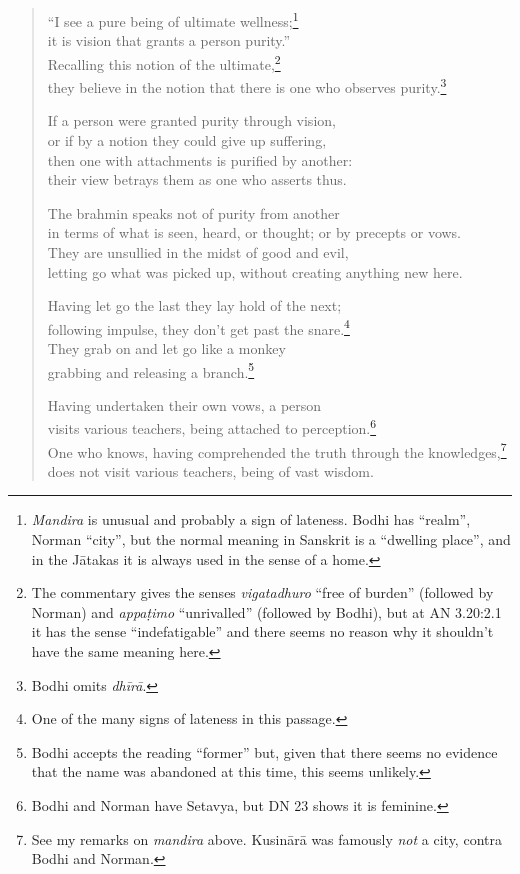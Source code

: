 \documentclass[12pt,openany]{book}%
\begin{document}
\begin{verse}%
“I see a pure being of ultimate wellness;\footnote{\textit{Mandira} is unusual and probably a sign of lateness. Bodhi has “realm”, Norman “city”, but the normal meaning in Sanskrit is a “dwelling place”, and in the \textsanskrit{Jātakas} it is always used in the sense of a home. } \\
it is vision that grants a person purity.” \\
Recalling this notion of the ultimate,\footnote{The commentary gives the senses \textit{vigatadhuro} “free of burden” (followed by Norman) and \textit{\textsanskrit{appaṭimo}} “unrivalled” (followed by Bodhi), but at AN 3.20:2.1 it has the sense “indefatigable” and there seems no reason why it shouldn’t have the same meaning here. } \\
they believe in the notion that there is one who observes purity.\footnote{Bodhi omits \textit{\textsanskrit{dhīrā}}. } 

If a person were granted purity through vision, \\
or if by a notion they could give up suffering, \\
then one with attachments is purified by another: \\
their view betrays them as one who asserts thus. 

The brahmin speaks not of purity from another \\
in terms of what is seen, heard, or thought; or by precepts or vows. \\
They are unsullied in the midst of good and evil, \\
letting go what was picked up, without creating anything new here. 

Having let go the last they lay hold of the next; \\
following impulse, they don’t get past the snare.\footnote{One of the many signs of lateness in this passage. } \\
They grab on and let go like a monkey \\
grabbing and releasing a branch.\footnote{Bodhi accepts the reading “former” but, given that there seems no evidence that the name was abandoned at this time, this seems unlikely. } 

Having undertaken their own vows, a person \\
visits various teachers, being attached to perception.\footnote{Bodhi and Norman have Setavya, but DN 23 shows it is feminine. } \\
One who knows, having comprehended the truth through the knowledges,\footnote{See my remarks on \textit{mandira} above. \textsanskrit{Kusinārā} was famously \emph{not} a city, contra Bodhi and Norman. } \\
does not visit various teachers, being of vast wisdom. 


\end{verse}
\end{document}
